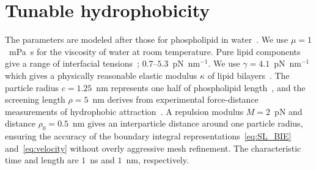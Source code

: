 \documentclass[prb,preprint,showpacs,preprintnumbers,amsmath,amssymb,longbibliography]{revtex4-2}
\renewcommand{\aa}{\mathbf{a}}
\renewcommand{\vv}{\mathbf{v}}
\begin{document}

\section{Tunable hydrophobicity}
\label{sec:tunable_hydrophobicity}
The parameters are modeled after those for phospholipid in
water~\cite{Boal}. We use $\mu = 1$~mPa~s for the viscosity of water at
room temperature. Pure lipid components give a range of interfacial
tensions~\cite{KUZMIN2005, Petelska2012,Jackson2016, GarciaSaez};
$0.7$--$5.3$~pN~nm$^{-1}$. We use $\gamma=4.1$~pN~nm$^{-1}$ which gives
a physically reasonable elastic modulus $\kappa$ of lipid
bilayers~\cite{Fu20, Fu2022_JFM}. The particle radius $c = 1.25$~nm
represents one half of phospholipid length~\cite{Boal}, and the
screening length $\rho = 5$~nm derives from experimental force-distance
measurements of hydrophobic attraction~\cite{ErLjCl89, Lietal05,
Israelachvili80, Jackson2016}. A repulsion modulus $M = 2$~pN and
distance $\rho_0 = 0.5$~nm gives an interparticle distance around one
particle radius, ensuring the accuracy of the boundary integral
representations~\eqref{eq:SL_BIE} and~\eqref{eq:velocity} without overly
aggressive mesh refinement. The characteristic time and length are
$1$~ns and $1$~nm, respectively.
\end{document}

